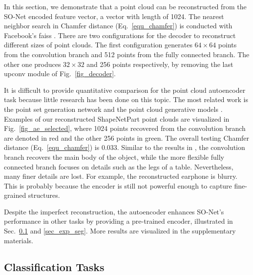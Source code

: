 \documentclass[10pt,twocolumn,letterpaper]{article}
\begin{document}
In this section, we demonstrate that a point cloud can be reconstructed from the SO-Net encoded feature vector, \eg a vector with length of 1024. The nearest neighbor search in Chamfer distance (Eq.~\ref{equ_chamfer}) is conducted with Facebook's faiss \cite{johnson2017billion}. There are two configurations for the decoder to reconstruct different sizes of point clouds. The first configuration generates $64\times64$ points from the convolution branch and 512 points from the fully connected branch. The other one produces $32\times32$ and 256 points respectively, by removing the last upconv module of Fig.~\ref{fig_decoder}.

It is difficult to provide quantitative comparison for the point cloud autoencoder task because little research has been done on this topic. The most related work is the point set generation network \cite{fan2016point} and the point cloud generative models \cite{achlioptas2017learning}. Examples of our reconstructed ShapeNetPart point clouds are visualized in Fig.~\ref{fig_ae_selected}, where 1024 points recovered from the convolution branch are denoted in red and the other 256 points in green. The overall testing Chamfer distance (Eq.~\ref{equ_chamfer}) is 0.033. Similar to the results in \cite{fan2016point}, the convolution branch recovers the main body of the object, while the more flexible fully connected branch focuses on details such as the legs of a table. Nevertheless, many finer details are lost. For example, the reconstructed earphone is blurry. This is probably because the encoder is still not powerful enough to capture fine-grained structures.

Despite the imperfect reconstruction, the autoencoder enhances SO-Net's performance in other tasks by providing a pre-trained encoder, illustrated in Sec.~\ref{sec_exp_cls} and \ref{sec_exp_seg}. More results are visualized in the supplementary materials.


\subsection{Classification Tasks} \label{sec_exp_cls}
\end{document}
